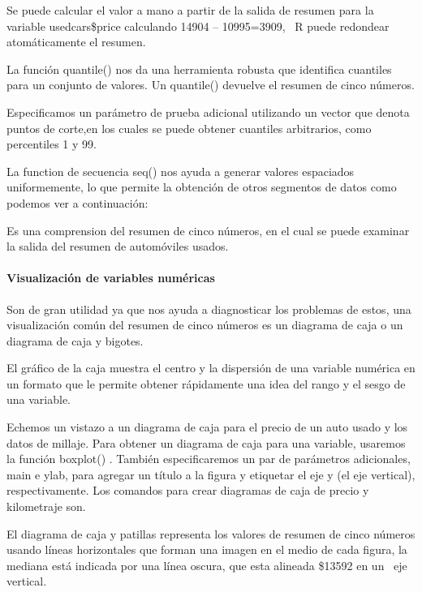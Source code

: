 \documentclass[
  letterpaper,
  DIV=11,
  numbers=noendperiod]{scrartcl}
\let\oldparagraph\paragraph
\renewcommand{\paragraph}[1]{\oldparagraph{#1}\mbox{}}
\begin{document}
Se puede calcular el valor a mano a partir de la salida de resumen para
la variable usedcars\$price calculando 14904 -- 10995=3909,~ R puede
redondear atomáticamente el resumen.

La función quantile() nos da una herramienta robusta que identifica
cuantiles para un conjunto de valores. Un quantile() devuelve el resumen
de cinco números.

Especificamos un parámetro de prueba adicional utilizando un vector que
denota puntos de corte,en los cuales se puede obtener cuantiles
arbitrarios, como percentiles 1 y 99.

La function de secuencia seq() nos ayuda a generar valores espaciados
uniformemente, lo que permite la obtención de otros segmentos de datos
como podemos ver a continuación:

Es una comprension del resumen de cinco números, en el cual se puede
examinar la salida del resumen de automóviles usados.

\hypertarget{visualizaciuxf3n-de-variables-numuxe9ricas}{%
\paragraph{\texorpdfstring{\textbf{Visualización de variables
numéricas}}{Visualización de variables numéricas}}\label{visualizaciuxf3n-de-variables-numuxe9ricas}}

Son de gran utilidad ya que nos ayuda a diagnosticar los problemas de
estos, una visualización común del resumen de cinco números es un
diagrama de caja o un diagrama de caja y bigotes.

El gráfico de la caja muestra el centro y la dispersión de una variable
numérica en un formato que le permite obtener rápidamente una idea del
rango y el sesgo de una variable.

Echemos un vistazo a un diagrama de caja para el precio de un auto usado
y los datos de millaje. Para obtener un diagrama de caja para una
variable, usaremos la función boxplot() . También especificaremos un par
de parámetros adicionales, main e ylab, para agregar un título a la
figura y etiquetar el eje y (el eje vertical), respectivamente. Los
comandos para crear diagramas de caja de precio y kilometraje son.

El diagrama de caja y patillas representa los valores de resumen de
cinco números usando líneas horizontales que forman una imagen en el
medio de cada figura, la mediana está indicada por una línea oscura, que
esta alineada \$13592 en un~ eje vertical.
\end{document}
